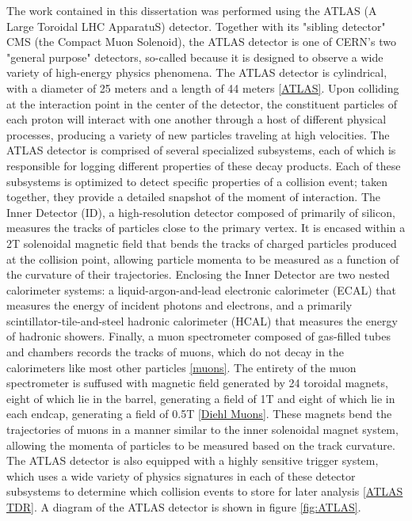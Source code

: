 The work contained in this dissertation was performed using the ATLAS (A Large Toroidal LHC ApparatuS) detector. Together with its "sibling detector" CMS (the Compact Muon Solenoid), the ATLAS detector is one of CERN's two "general purpose" detectors, so-called because it is designed to observe a wide variety of high-energy physics phenomena. The ATLAS detector is cylindrical, with a diameter of 25 meters and a length of 44 meters \ref{ATLAS}. Upon colliding at the interaction point in the center of the detector, the constituent particles of each proton will interact with one another through a host of different physical processes, producing a variety of new particles traveling at high velocities. The ATLAS detector is comprised of several specialized subsystems, each of which is responsible for logging different properties of these decay products. Each of these subsystems is optimized to detect specific properties of a collision event; taken together, they provide a detailed snapshot of the moment of interaction.
	The Inner Detector (ID), a high-resolution detector composed of primarily of silicon, measures the tracks of particles close to the primary vertex. It is encased within a 2T solenoidal magnetic field that bends the tracks of charged particles produced at the collision point, allowing particle momenta to be measured as a function of the curvature of their trajectories. Enclosing the Inner Detector are two nested calorimeter systems: a liquid-argon-and-lead electronic calorimeter (ECAL) that measures the energy of incident photons and electrons, and a primarily scintillator-tile-and-steel hadronic calorimeter (HCAL) that measures the energy of hadronic showers. Finally, a muon spectrometer composed of gas-filled tubes and chambers records the tracks of muons, which do not decay in the calorimeters like most other particles \ref{muons}.
	The entirety of the muon spectrometer is suffused with magnetic field generated by 24 toroidal magnets, eight of which lie in the barrel, generating a field of 1T and eight of which lie in each endcap, generating a field of 0.5T \ref{Diehl Muons}. These magnets bend the trajectories of muons in a manner similar to the inner solenoidal magnet system, allowing the momenta of particles to be measured based on the track curvature. The ATLAS detector is also equipped with a highly sensitive trigger system, which uses a wide variety of physics signatures in each of these detector subsystems to determine which collision events to store for later analysis \ref{ATLAS TDR}. A diagram of the ATLAS detector is shown in figure \ref{fig:ATLAS}.

